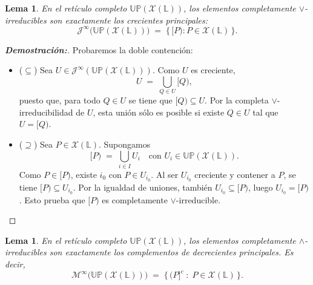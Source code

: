 \documentclass[12pt]{book}
\newtheorem{lemma}[theorem]{Lema}
\newcommand{\up}[1]{[{#1})}
\newcommand{\downc}[1]{({#1}]^{c}}
\newcommand{\Up}{\mathbb{UP}}
\begin{document}
\begin{lemma}\label{lem:irreducibles-principales}
En el retículo completo $\Up(\mathcal{X}(\mathbb L))$,
los elementos completamente $\vee$-irreducibles son exactamente los crecientes principales:
\[
\mathcal J^\infty\bigl(\Up(\mathcal{X}(\mathbb L))\bigr)
\;=\;
\{\,\up{P}: P\in\mathcal{X}(\mathbb L)\,\}.
\]
\end{lemma}

\begin{proof}[\textbf{Demostración:}]
Probaremos la doble contención:
\begin{itemize}
    \item (\(\subseteq\)) Sea $U\in\mathcal J^\infty(\Up(\mathcal{X}(\mathbb L)))$.
Como $U$ es creciente,
\[
U \;=\; \bigcup_{Q\in U} \up{Q},
\]
puesto que, para todo $Q \in U$ se tiene que $\up{Q}\subseteq U$. Por la completa $\vee$-irreducibilidad de $U$,
esta unión sólo es posible si existe $Q\in U$ tal que $U=\up{Q}$.

\item (\(\supseteq\)) Sea $P\in\mathcal{X}(\mathbb L)$. Supongamos
\[
\up{P} \;=\; \bigcup_{i\in I} U_i
\quad\text{con } U_i\in \Up(\mathcal{X}(\mathbb L)).
\]
Como $P\in\up{P}$, existe $i_0$ con $P\in U_{i_0}$. Al ser $U_{i_0}$ creciente y contener a $P$,
se tiene $\up{P}\subseteq U_{i_0}$. Por la igualdad de uniones, también $U_{i_0}\subseteq \up{P}$,
luego $U_{i_0}=\up{P}$. Esto prueba que $\up{P}$ es completamente $\vee$-irreducible.
\end{itemize}
\end{proof}

\begin{lemma}\label{lem:meet-irreducibles-complementos}
En el retículo completo $\Up(\mathcal{X}(\mathbb L))$, los elementos completamente $\wedge$-irreducibles son exactamente los complementos de decrecientes principales. Es decir,
\[
\mathcal M^\infty\bigl(\Up(\mathcal{X}(\mathbb L))\bigr)
\;=\;
\bigl\{\,\downc{P}\;:\;P\in\mathcal{X}(\mathbb L)\,\bigr\}.
\]
\end{lemma}
\end{document}
